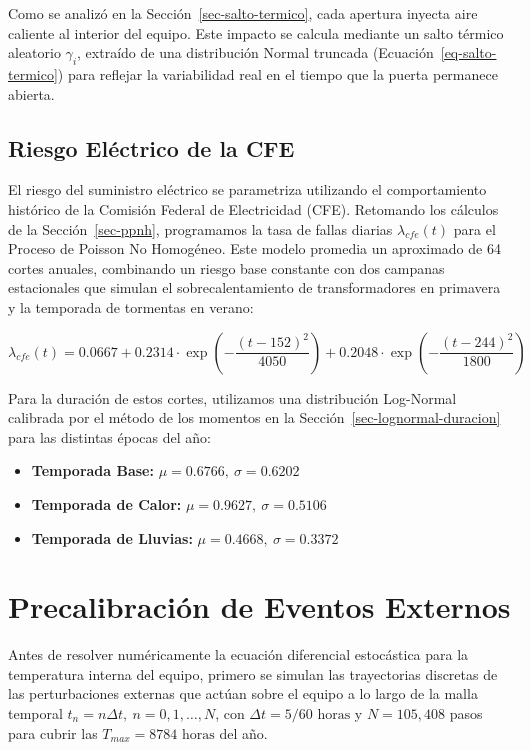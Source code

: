 \documentclass[
  spanish,
  letterpaper,
  DIV=11,
  numbers=noendperiod]{scrreprt}
\providecommand{\tightlist}{%
  \setlength{\itemsep}{0pt}\setlength{\parskip}{0pt}}
\theoremstyle{plain}
\theoremstyle{plain}
\theoremstyle{plain}
\theoremstyle{definition}
\theoremstyle{remark}
\begin{document}
Como se analizó en la Sección~\ref{sec-salto-termico}, cada apertura
inyecta aire caliente al interior del equipo. Este impacto se calcula
mediante un salto térmico aleatorio \(\gamma_i\), extraído de una
distribución Normal truncada (Ecuación~\ref{eq-salto-termico}) para
reflejar la variabilidad real en el tiempo que la puerta permanece
abierta.

\subsection{Riesgo Eléctrico de la CFE}\label{sec-riesgo-cfe}

El riesgo del suministro eléctrico se parametriza utilizando el
comportamiento histórico de la Comisión Federal de Electricidad (CFE).
Retomando los cálculos de la Sección~\ref{sec-ppnh}, programamos la tasa
de fallas diarias \(\lambda_{cfe}(t)\) para el Proceso de Poisson No
Homogéneo. Este modelo promedia un aproximado de 64 cortes anuales,
combinando un riesgo base constante con dos campanas estacionales que
simulan el sobrecalentamiento de transformadores en primavera y la
temporada de tormentas en verano:

\[
\lambda_{cfe}(t) = 0.0667 + 0.2314 \cdot \exp\left(-\frac{(t - 152)^2}{4050}\right) + 0.2048 \cdot \exp\left(-\frac{(t - 244)^2}{1800}\right)
\]

Para la duración de estos cortes, utilizamos una distribución Log-Normal
calibrada por el método de los momentos en la
Sección~\ref{sec-lognormal-duracion} para las distintas épocas del año:

\begin{itemize}
\tightlist
\item
  \textbf{Temporada Base:} \(\mu = 0.6766, \ \sigma = 0.6202\)
\item
  \textbf{Temporada de Calor:} \(\mu = 0.9627, \ \sigma = 0.5106\)
\item
  \textbf{Temporada de Lluvias:} \(\mu = 0.4668, \ \sigma = 0.3372\)
\end{itemize}

\section{Precalibración de Eventos
Externos}\label{precalibraciuxf3n-de-eventos-externos}

Antes de resolver numéricamente la ecuación diferencial estocástica para
la temperatura interna del equipo, primero se simulan las trayectorias
discretas de las perturbaciones externas que actúan sobre el equipo a lo
largo de la malla temporal \(t_n = n\Delta t, \ n = 0, 1, \dots, N\),
con \(\Delta t = 5/60\text{ horas}\) y \(N = 105,408\) pasos para cubrir
las \(T_{max} = 8784\text{ horas}\) del año.
\end{document}
